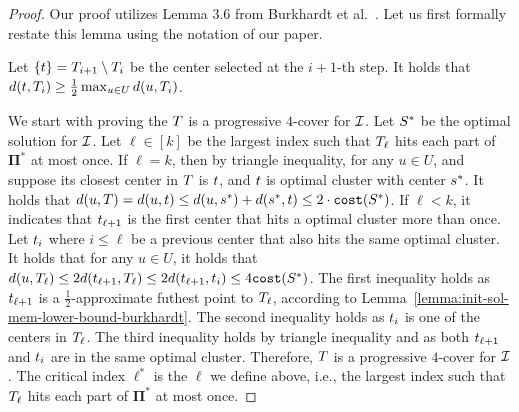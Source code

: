 \lambdaellstarlowerboundsmallerqueries* 
\begin{proof}
    Our proof utilizes Lemma 3.6 from Burkhardt et al.~\cite{burkhardt2024low}.
    Let us first formally restate this lemma using the notation of our paper. 
    \begin{lemma}
        \label{lemma:init-sol-mem-lower-bound-burkhardt}
        Let $\{t\} = T_{i+1} \setminus T_{i}$ be the center selected at the $i+1$-th step. 
        It holds that $d(t, T_{i}) \geq \frac{1}{2} \max_{u \in U} d(u, T_{i})$. 
    \end{lemma}

We start with proving the $T$ is a progressive $4$-cover for $\mathcal{I}$.
Let $S^*$ be the optimal solution for $\mathcal{I}$.
Let $\ell \in [k]$ be the largest index such that $T_{\ell}$ hits each part of $\mathbf{\Pi}^*$ at most once.
If $\ell = k$, then by triangle inequality, for any $u \in U$, and suppose its closest center in $T$ is $t$, and $t$ is optimal cluster with center $s^*$. It holds that $d(u, T) = d(u, t) \leq d(u, s^*) + d(s^*, t) \leq 2\cdot \texttt{cost}(S^*)$.
If $\ell < k$, it indicates that $t_{\ell+1}$ is the first center that hits a optimal cluster 
more than once.  
Let $t_{i}$ where $i\leq \ell$ be a previous center that also hits the same optimal cluster. 
It holds that for any $u \in U$, it holds that $d(u, T_{\ell}) \leq 2 d(t_{\ell+1}, T_{\ell}) \leq 2 d(t_{\ell + 1}, t_{i}) \leq 4 \texttt{cost}(S^*)$.
The first inequality holds as $t_{\ell+1}$ is a $\frac{1}{2}$-approximate futhest point to $T_{\ell}$, according to Lemma~\ref{lemma:init-sol-mem-lower-bound-burkhardt}.
The second inequality holds as $t_{i}$ is one of the centers in $T_{\ell}$. 
The third inequality holds by triangle inequality and as both $t_{\ell+1}$ and $t_{i}$ are in the same optimal cluster. 
Therefore, $T$ is a progressive $4$-cover for $\mathcal{I}$. 
The critical index $\ell^*$ is the $\ell$ we define above, i.e., the largest index such that $T_{\ell}$ hits each part of $\mathbf{\Pi}^*$ at most once.


\end{proof}
